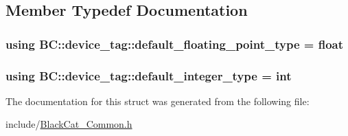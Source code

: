 \subsection{Member Typedef Documentation}
\subsubsection[{\texorpdfstring{default\+\_\+floating\+\_\+point\+\_\+type}{default_floating_point_type}}]{\setlength{\rightskip}{0pt plus 5cm}using {\bf B\+C\+::device\+\_\+tag\+::default\+\_\+floating\+\_\+point\+\_\+type} =  float}\hypertarget{structBC_1_1device__tag_a537fb7db04f78815f579f49afac5febf}{}\label{structBC_1_1device__tag_a537fb7db04f78815f579f49afac5febf}
\subsubsection[{\texorpdfstring{default\+\_\+integer\+\_\+type}{default_integer_type}}]{\setlength{\rightskip}{0pt plus 5cm}using {\bf B\+C\+::device\+\_\+tag\+::default\+\_\+integer\+\_\+type} =  int}\hypertarget{structBC_1_1device__tag_a39fe8604bf94b5b66fd55137ddb91993}{}\label{structBC_1_1device__tag_a39fe8604bf94b5b66fd55137ddb91993}


The documentation for this struct was generated from the following file\+:\begin{DoxyCompactItemize}
\item 
include/\hyperlink{BlackCat__Common_8h}{Black\+Cat\+\_\+\+Common.\+h}\end{DoxyCompactItemize}
